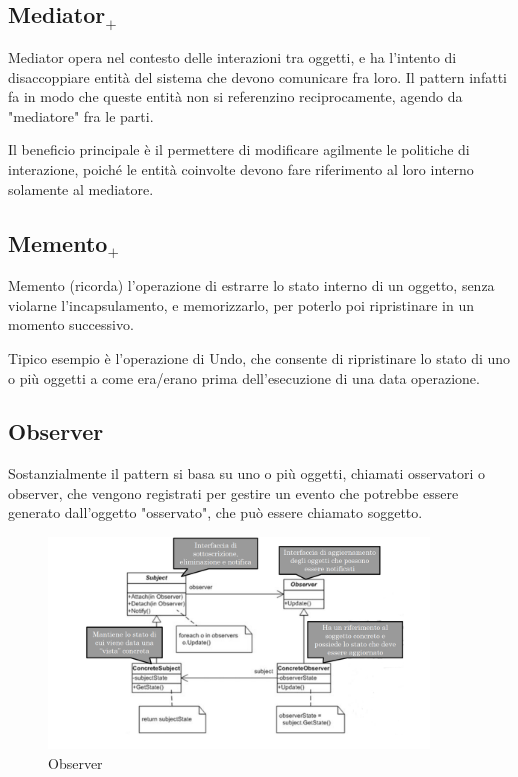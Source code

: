 \subsection{Mediator$_+$}
Mediator opera nel contesto delle interazioni tra oggetti, e ha l'intento di disaccoppiare entità del sistema che devono comunicare fra loro. 
Il pattern infatti fa in modo che queste entità non si referenzino reciprocamente, agendo da "mediatore" fra le parti.

Il beneficio principale è il permettere di modificare agilmente le politiche di interazione, poiché le entità coinvolte devono fare riferimento al loro interno solamente al mediatore.

\subsection{Memento$_+$}
Memento (ricorda) l'operazione di estrarre lo stato interno di un oggetto, senza violarne l'incapsulamento, e memorizzarlo, per poterlo poi ripristinare in un momento successivo.

Tipico esempio è l'operazione di Undo, che consente di ripristinare lo stato di uno o più oggetti a come era/erano prima dell'esecuzione di una data operazione.
\subsection{Observer}

Sostanzialmente il pattern si basa su uno o più oggetti, chiamati osservatori o observer, che vengono registrati per gestire un evento che potrebbe essere generato dall'oggetto "osservato", che può essere chiamato soggetto.

\begin{figure}[H]
\includegraphics[width=0.9\textwidth]{res/img/DP/observer}
\caption{Observer}
\end{figure}

